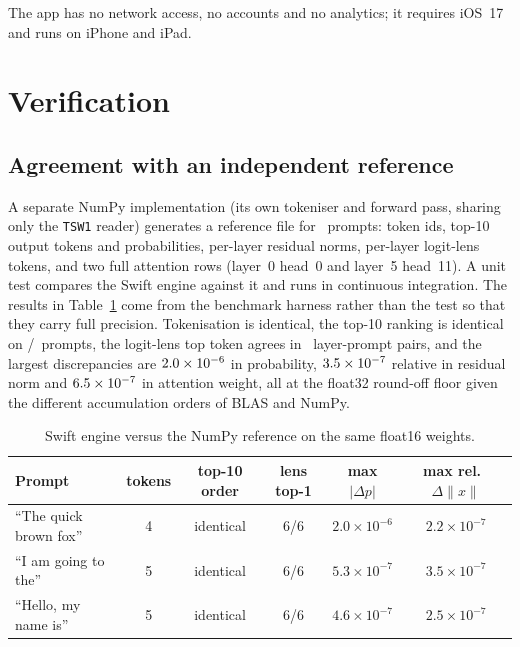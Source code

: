 \documentclass[11pt]{article}
\begin{document}
The app has no network access, no accounts and no analytics; it requires iOS~17 and runs on iPhone and iPad.

\section{Verification}\label{sec:verify}
\subsection{Agreement with an independent reference}
A separate NumPy implementation (its own tokeniser and forward pass, sharing only the \texttt{TSW1} reader) generates a reference file for \AgreePrompts\ prompts: token ids, top-10 output tokens and probabilities, per-layer residual norms, per-layer logit-lens tokens, and two full attention rows (layer~0 head~0 and layer~5 head~11). A unit test compares the Swift engine against it and runs in continuous integration. The results in Table~\ref{tab:agree} come from the benchmark harness rather than the test so that they carry full precision. Tokenisation is identical, the top-10 ranking is identical on \AgreeTopTenExact/\AgreePrompts\ prompts, the logit-lens top token agrees in \AgreeLensExact\ layer-prompt pairs, and the largest discrepancies are $2.0\times10^{-6}$ in probability, $3.5\times10^{-7}$ relative in residual norm and $6.5\times10^{-7}$ in attention weight, all at the float32 round-off floor given the different accumulation orders of BLAS and NumPy.

\begin{table}[t]\centering\small
\begin{tabular}{lccccc}\toprule
Prompt & tokens & top-10 order & lens top-1 & max $|\Delta p|$ & max rel.\ $\Delta\|x\|$ \\\midrule
``The quick brown fox'' & 4 & identical & 6/6 & $2.0\times10^{-6}$ & $2.2\times10^{-7}$ \\
``I am going to the'' & 5 & identical & 6/6 & $5.3\times10^{-7}$ & $3.5\times10^{-7}$ \\
``Hello, my name is'' & 5 & identical & 6/6 & $4.6\times10^{-7}$ & $2.5\times10^{-7}$ \\
\bottomrule\end{tabular}
\caption{Swift engine versus the NumPy reference on the same float16 weights.}
\label{tab:agree}\end{table}
\end{document}

